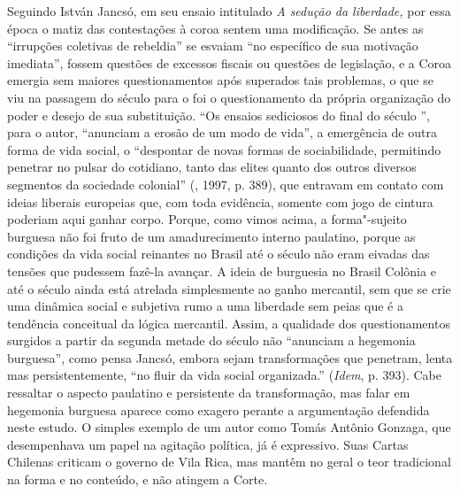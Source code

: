 {Seguindo István Jancsó, em seu ensaio intitulado \emph{A sedução da
liberdade,} por essa época o matiz das contestações à coroa sentem uma
modificação. Se antes as ``irrupções coletivas de rebeldia'' se esvaiam
``no específico de sua motivação imediata'', fossem questões de excessos
fiscais ou questões de legislação, e a Coroa emergia sem maiores
questionamentos após superados tais problemas, o que se viu na passagem
do século  para o  foi o questionamento da própria organização
do poder e desejo de sua substituição. ``Os ensaios sediciosos do final
do século '', para o autor, ``anunciam a erosão de um modo de
vida'', a emergência de outra forma de vida social, o ``despontar de
novas formas de sociabilidade, permitindo penetrar no pulsar do
cotidiano, tanto das elites quanto dos outros diversos segmentos da
sociedade colonial'' (, 1997, p. 389), que entravam em contato com
ideias liberais europeias que, com toda evidência, somente com jogo de
cintura poderiam aqui ganhar corpo. Porque, como vimos acima, a
forma"-sujeito burguesa não foi fruto de um amadurecimento interno
paulatino, porque as condições da vida social reinantes no Brasil até o
século  não eram eivadas das tensões que pudessem fazê-la avançar. A
ideia de burguesia no Brasil Colônia e até o século  ainda está
atrelada simplesmente ao ganho mercantil, sem que se crie uma dinâmica
social e subjetiva rumo a uma liberdade sem peias que é a tendência
conceitual da lógica mercantil. Assim, a qualidade dos questionamentos
surgidos a partir da segunda metade do século  não ``anunciam a
hegemonia burguesa'', como pensa Jancsó, embora sejam transformações que
penetram, lenta mas persistentemente, ``no fluir da vida social
organizada.'' (\emph{Idem}, p. 393). Cabe ressaltar o aspecto paulatino
e persistente da transformação, mas falar em hegemonia burguesa aparece
como exagero perante a argumentação defendida neste estudo. O simples
exemplo de um autor como Tomás Antônio Gonzaga, que desempenhava um
papel na agitação política, já é expressivo. Suas Cartas Chilenas
criticam o governo de Vila Rica, mas mantêm no geral o teor tradicional
na forma e no conteúdo, e não atingem a Corte.

}
